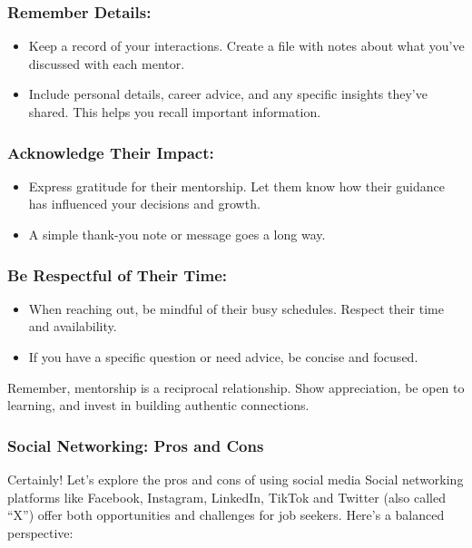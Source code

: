 \subsubsection*{Remember Details:}
\begin{itemize}[leftmargin=1.0cm]
\item Keep a record of your interactions. Create a file with notes about what you've discussed with each mentor.
\item Include personal details, career advice, and any specific insights they've shared. This helps you recall important information.
\end{itemize}
\subsubsection*{Acknowledge Their Impact:}
\begin{itemize}[leftmargin=1.0cm]
\item Express gratitude for their mentorship. Let them know how their guidance has influenced your decisions and growth.
\item A simple thank-you note or message goes a long way.
\end{itemize}
\subsubsection*{Be Respectful of Their Time:}
\begin{itemize}[leftmargin=1.0cm]
\item When reaching out, be mindful of their busy schedules. Respect their time and availability.
\item If you have a specific question or need advice, be concise and focused.
\end{itemize}
Remember, mentorship is a reciprocal relationship. Show appreciation, be open to learning, and invest in building authentic connections.

\subsubsection*{Social Networking: Pros and Cons}
Certainly! Let's explore the pros and cons of using social media Social networking platforms like Facebook, Instagram, LinkedIn, TikTok and Twitter (also called ``X'') offer both opportunities and challenges for job seekers. Here's a balanced perspective:

